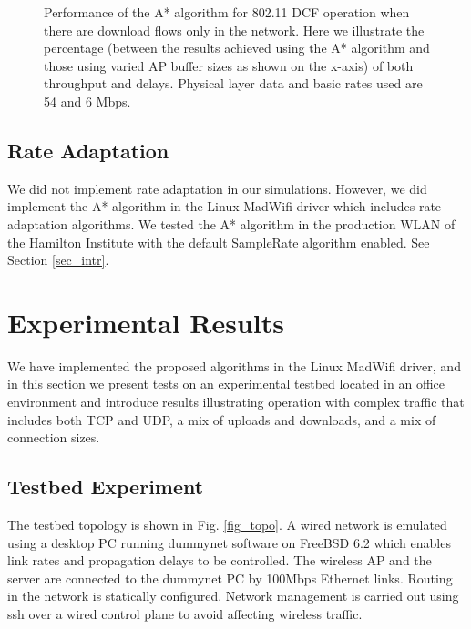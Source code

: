 \documentclass[10pt,twocolumn, journal]{IEEEtran}
\begin{document}
\begin{figure}[tb]
   \centering
   \caption{Performance of the A* algorithm for 802.11 DCF operation when there are download flows only in the network. Here we illustrate the percentage (between the results achieved using the A* algorithm and those using varied AP buffer sizes as shown on the x-axis) of both throughput and delays. Physical layer data and basic rates used are 54 and 6 Mbps. }
   \label{fig_dcf}
\end{figure}

\subsection{Rate Adaptation}
We did not implement rate adaptation in our simulations.  However, we did implement the
A* algorithm in the Linux MadWifi driver which includes rate adaptation algorithms.  We
tested the A* algorithm in the production WLAN of the Hamilton Institute with the default
SampleRate algorithm enabled. See Section \ref{sec_intr}.

\section{Experimental Results} \label{sec_expt}

We have implemented the proposed algorithms in the Linux MadWifi driver, and in this section we
present tests on an experimental testbed located in an office environment and introduce
results illustrating operation with complex traffic that includes both TCP and UDP, a mix
of uploads and downloads, and a mix of connection sizes.

\subsection{Testbed Experiment}
The testbed topology is shown in Fig. \ref{fig_topo}. A wired network is emulated using
a desktop PC running dummynet software on FreeBSD 6.2 which enables link rates and
propagation delays to be controlled. The wireless AP and the server are connected to the
dummynet PC by 100Mbps Ethernet links.  Routing in the network is statically configured.
Network management is carried out using ssh over a wired control plane to avoid affecting
wireless traffic.
\end{document}
